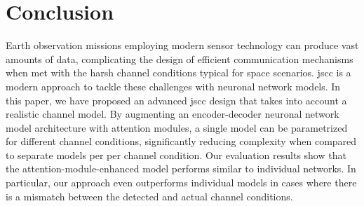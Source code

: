 \documentclass[conference]{IEEEtran}
\begin{document}
\section{Conclusion}
\label{sec:conclusion}

Earth observation missions employing modern sensor technology can produce vast amounts of data, complicating the design of efficient communication mechanisms when met with the harsh channel conditions typical for space scenarios.
\Acf{jscc} is a modern approach to tackle these challenges with neuronal network models.
In this paper, we have proposed an advanced \ac{jscc} design that takes into account a realistic channel model.
By augmenting an encoder-decoder neuronal network model architecture with attention modules, a single model can be parametrized for different channel conditions, significantly reducing complexity when compared to separate models per per channel condition.
Our evaluation results show that the attention-module-enhanced model performs similar to individual networks.
In particular, our approach even outperforms individual models in cases where there is a mismatch between the detected and actual channel conditions.



\end{document}
